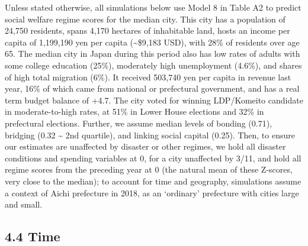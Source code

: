 \documentclass[preprint, 3p,
authoryear]{elsarticle} %
\begin{document}
Unless stated otherwise, all simulations below use Model 8 in Table A2
to predict social welfare regime scores for the median city. This city
has a population of 24,750 residents, spans 4,170 hectares of
inhabitable land, hosts an income per capita of 1,199,190 yen per capita
(\textasciitilde\$9,183 USD), with 28\% of residents over age 65. The
median city in Japan during this period also has low rates of adults
with some college education (25\%), moderately high unemployment
(4.6\%), and shares of high total migration (6\%). It received 503,740
yen per capita in revenue last year, 16\% of which came from national or
prefectural government, and has a real term budget balance of +4.7. The
city voted for winning LDP/Komeito candidate in moderate-to-high rates,
at 51\% in Lower House elections and 32\% in prefectural elections.
Further, we assume median levels of bonding (0.71), bridging (0.32
\textasciitilde{} 2nd quartile), and linking social capital (0.25).
Then, to ensure our estimates are unaffected by disaster or other
regimes, we hold all disaster conditions and spending variables at 0,
for a city unaffected by 3/11, and hold all regime scores from the
preceding year at 0 (the natural mean of these Z-scores, very close to
the median); to account for time and geography, simulations assume a
context of Aichi prefecture in 2018, as an `ordinary' prefecture with
cities large and small.

\hypertarget{time}{%
\subsection{4.4 Time}\label{time}}

\newpage
\renewcommand{\baselinestretch}{0.5}\selectfont
\renewcommand{\arraystretch}{1.5}

\begingroup\fontsize{9}{11}\selectfont
\end{document}
